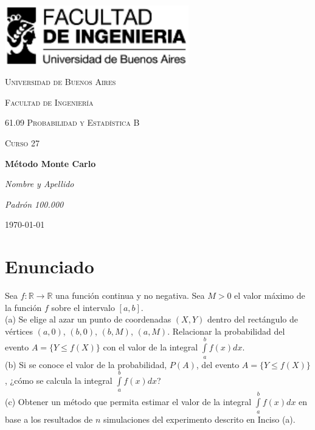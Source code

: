 \documentclass[a4paper]{article}
\begin{document}
\begin{titlepage}
  \centering
  \includegraphics[width=0.6\textwidth]{logo_fiuba.pdf}\par\vspace{1cm}
  {\scshape\LARGE Universidad de Buenos Aires \par}
  {\scshape\LARGE Facultad de Ingeniería \par}
  \vspace{1cm}
  {\scshape\Large 61.09 Probabilidad y Estadística B\par}
  {\scshape\Large Curso 27\par}
  \vspace{1.5cm}
  {\huge\bfseries Método Monte Carlo\par}
  \vspace{2cm}
  {\Large\itshape Nombre y Apellido \par}
  {\Large\itshape Padrón 100.000 \par}

  \vfill

  {\large \today\par}
\end{titlepage}

\newpage

\section*{Enunciado}
Sea $f: \mathbb{R} \to \mathbb{R}$ una función continua y no negativa.
Sea $M > 0$ el valor máximo de la función $f$ sobre el intervalo $[a, b]$. \\

(a) Se elige al azar un punto de coordenadas $(X, Y)$ dentro del rectángulo de
vértices $(a, 0)$, $(b, 0)$, $(b, M)$, $(a, M)$. Relacionar la probabilidad
del evento $A = \{ Y \leqslant f(X) \}$ con el valor de la integral
$\int\limits_a^b f(x) dx$. \\

(b) Si se conoce el valor de la probabilidad, $P(A)$, del evento
$A = \{ Y \leqslant f(X) \}$, ¿cómo se calcula la integral
$\int\limits_a^b f(x) dx$? \\

(c) Obtener un método que permita estimar el valor de la integral
$\int\limits_a^b f(x) dx$ en base a los resultados de $n$ simulaciones del
experimento descrito en Inciso (a). \\
\end{document}

